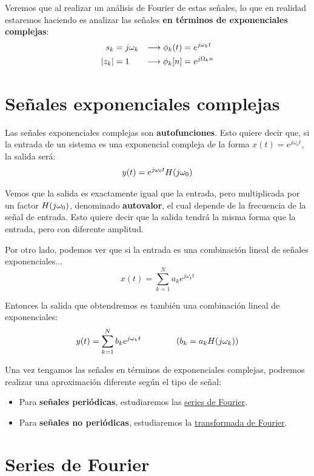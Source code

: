 \documentclass[a4paper]{book}
\begin{document}
Veremos que al realizar un análisis de Fourier de estas señales, lo que en realidad estaremos haciendo es analizar las señales \textbf{en términos de exponenciales complejas}:
\begin{align*}
&  &  &  &  &  &  &  & s_k       & = j\omega_k & \longrightarrow  \phi_k(t) & = e^{j\omega_kt} &  &  &  &  &  &  &  & \\
&  &  &  &  &  &  &  & \abs{z_k} & = 1         & \longrightarrow  \phi_k[n] & = e^{j\Omega_kn} &  &  &  &  &  &  &  &
\end{align*}

\section{Señales exponenciales complejas}
Las señales exponenciales complejas son \textbf{autofunciones}. Esto quiere decir que, si la entrada de un sistema es una exponencial compleja de la forma $x(t) = e^{j\omega_ot}$, la salida será: \[y(t) = e^{j \omega _0 t} H (j\omega _0)\]

Vemos que la salida es exactamente igual que la entrada, pero multiplicada por un factor $H (j\omega _0)$, denominado \textbf{autovalor}, el cual depende de la frecuencia de la señal de entrada. Esto quiere decir que la salida tendrá la misma forma que la entrada, pero con diferente amplitud.

Por otro lado, podemos ver que si la entrada es una combinación lineal de señales exponenciales... \[x(t) = \sum^{N}_{k=1}{a_ke^{j\omega _kt}}\]

Entonces la salida que obtendremos es también una combinación lineal de exponenciales: \[y(t) = \sum^{N}_{k=1}{b_ke^{j\omega _kt}} \qquad \qquad \left( b_k = a_k H{\left( j\omega _k \right)} \right)\]

Una vez tengamos las señales en términos de exponenciales complejas, podremos realizar una aproximación diferente según el tipo de señal:
\begin{itemize}
\item Para \textbf{señales periódicas}, estudiaremos las \hyperref[sec:Series_de_Fourier]{series de Fourier}.
\item Para \textbf{señales no periódicas}, estudiaremos la \hyperref[sec:Transformada_de_Fourier]{transformada de Fourier}.
\end{itemize}


\section{Series de Fourier} \label{sec:Series_de_Fourier}
\end{document}

